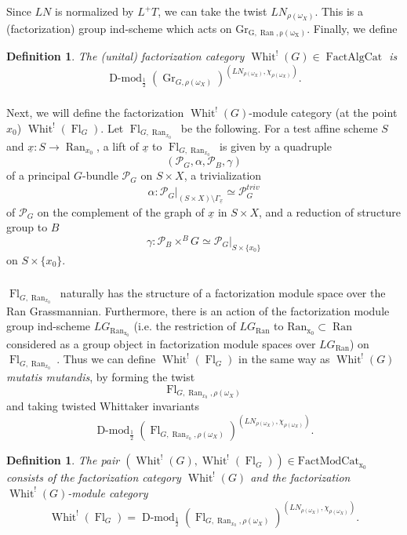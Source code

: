 \documentclass[10pt,a4paper]{amsart}
\newtheorem{defn}[subsubsection]{Definition}
\newcommand{\on}[1]{\operatorname{#1}}
\newcommand{\Dmod}{\on{D-mod}}
\newcommand{\FactAlgCat}{\on{FactAlgCat}}
\newcommand{\FactModCat}{\on{FactModCat_{x_0}}}
\newcommand{\sssec}[1]{\subsubsection{}}
\begin{document}
Since $LN$ is normalized by $L^+T$, we can take the twist $LN_{\rho(\omega_X)}$. This is a (factorization) group ind-scheme which acts on $\on{Gr_{G, \on{Ran}, \rho(\omega_X)}}$. Finally, we define

\begin{defn}
    The (unital) factorization category $\on{Whit}^!(G) \in \FactAlgCat$ is
    $$
    \Dmod_{\frac{1}{2}}(\on{Gr}_{G, \rho(\omega_X)})^{(LN_{\rho(\omega_X)}, \chi_{\rho(\omega_X)})} .
    $$
\end{defn}

\sssec{}
Next, we will define the factorization $\on{Whit}^!(G)$-module category (at the point $x_0$) $\on{Whit}^!(\on{Fl}_G)$. Let $\on{Fl}_{G, \on{Ran}_{x_0}}$ be the following. For a test affine scheme $S$ and $\underline{x} : S \to \on{Ran}_{x_0}$, a lift of $\underline{x}$ to $\on{Fl}_{G, \on{Ran}_{x_0}}$ is given by a quadruple
$$
    (\mathcal{P}_G, \alpha, \mathcal{P}_B, \gamma)
$$
of a principal $G$-bundle $\mathcal{P}_G$ on $S \times X$, a trivialization
$$
\alpha: \mathcal{P}_G|_{(S \times X) \setminus \Gamma_{\underline{x}}} \simeq \mathcal{P}_G^{triv}
$$
of $\mathcal{P}_G$ on the complement of the graph of $\underline{x}$ in $S \times X$, and a reduction of structure group to $B$
$$
\gamma : \mathcal{P}_B \times^B G \simeq \mathcal{P}_G|_{S \times \{x_0\}}
$$
on $S \times \{x_0\}$.

\sssec{}
$\on{Fl}_{G, \on{Ran}_{x_0}}$ naturally has the structure of a factorization module space over the Ran Grassmannian. Furthermore, there is an action of the factorization module group ind-scheme $LG_{\on{Ran_{x_0}}}$ (i.e. the restriction of $LG_{\on{Ran}}$ to $\on{Ran_{x_0}} \subset \on{Ran}$ considered as a group object in factorization module spaces over $LG_{\on{Ran}}$) on $\on{Fl}_{G, \on{Ran}_{x_0}}$. Thus we can define $\on{Whit}^!(\on{Fl}_G)$ in the same way as $\on{Whit}^!(G)$ \emph{mutatis mutandis}, by forming the twist
$$
\on{Fl}_{G, \on{Ran}_{x_0}, \rho(\omega_X)}
$$
and taking twisted Whittaker invariants
$$
\Dmod_{\frac{1}{2}}(\on{Fl}_{G, \on{Ran}_{x_0}, \rho(\omega_X)})^{(LN_{\rho(\omega_X)}, \chi_{\rho(\omega_X)})}.
$$

\begin{defn}
    The pair $(\on{Whit}^!(G), \on{Whit}^!(\on{Fl}_G)) \in \FactModCat$ consists of the factorization category $\on{Whit}^!(G)$ and the factorization $\on{Whit}^!(G)$-module category 
    $$
    \on{Whit}^!(\on{Fl}_G) = \Dmod_{\frac{1}{2}}(\on{Fl}_{G, \on{Ran}_{x_0}, \rho(\omega_X)})^{(LN_{\rho(\omega_X)}, \chi_{\rho(\omega_X)})} .
    $$
\end{defn}
\end{document}
